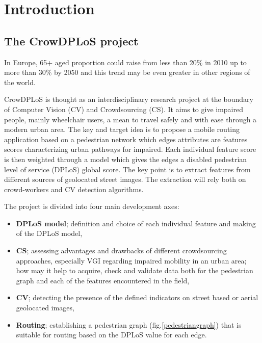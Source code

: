 \documentclass[10pt,conference,a4paper]{IEEEtran}
\begin{document}
\section{Introduction}


\subsection{The CrowDPLoS project}
In Europe, 65+ aged proportion could raise from less than 20\% in 2010 up to more than 30\%  by 2050 \cite{walker2012active} and this trend may be even greater in other regions of the world. 

CrowDPLoS is thought as an interdisciplinary research project at the boundary of Computer Vision (CV) and Crowdsourcing (CS). It aims to give impaired people, mainly wheelchair users, a mean to travel safely and with ease through a modern urban area. The key and target idea is to propose a mobile routing application based on a pedestrian network which edges attributes are features scores characterizing urban pathways for impaired. Each individual feature score is then weighted through a model which gives the edges a disabled pedestrian level of service (DPLoS) global score. The key point is to extract features from different sources of geolocated street images. The extraction will rely both on crowd-workers and CV detection algorithms.

The project is divided into four main development axes:
\begin{itemize}\renewcommand\labelitemi{--} 
\setlength\itemsep{0.08em} 
\setlength{\itemindent}{-0.64em}
\item \textbf{DPLoS model}; definition and choice of each individual feature and making of the DPLoS model,
\item \textbf{CS}; assessing advantages and drawbacks of different crowdsourcing approaches, especially VGI  regarding impaired mobility in an urban area; how may it help to acquire, check and validate data both for the pedestrian graph and each of the features encountered in the field,
\item \textbf{CV}; detecting the presence of the defined indicators on street based or aerial geolocated images,
\item \textbf{Routing}; establishing a pedestrian graph (fig.\ref{pedestriangraph}) that is suitable for routing based on the DPLoS value for each edge.
\end{itemize}
\end{document}
